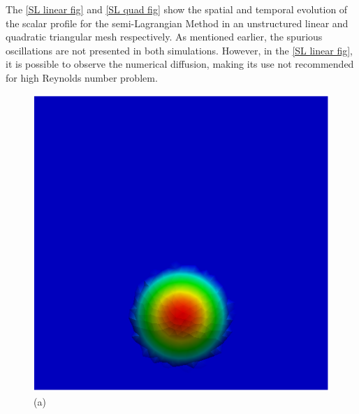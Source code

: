 \vspace{-1cm}
The \ref{SL linear fig} and \ref{SL quad fig} 
show the spatial and temporal evolution
of the scalar profile for the semi-Lagrangian Method in an
unstructured linear and quadratic triangular mesh  
respectively. As mentioned earlier, the spurious oscillations 
are not presented in both simulations. 
However, in the \ref{SL linear fig}, it is possible
to observe the numerical diffusion, making its use not
recommended for high Reynolds number problem.

\vspace{0.5cm}
\begin{figure}[H]
     \centering
     \begin{minipage}{.5\linewidth}
      \centering
      \includegraphics[scale=0.42]{./02_chaps/cap_validation/figure/figSLlinear0.png}\\
      (a)
     \end{minipage}%
     \begin{minipage}{.5\linewidth}
      \centering

\end{minipage}
\end{figure}
